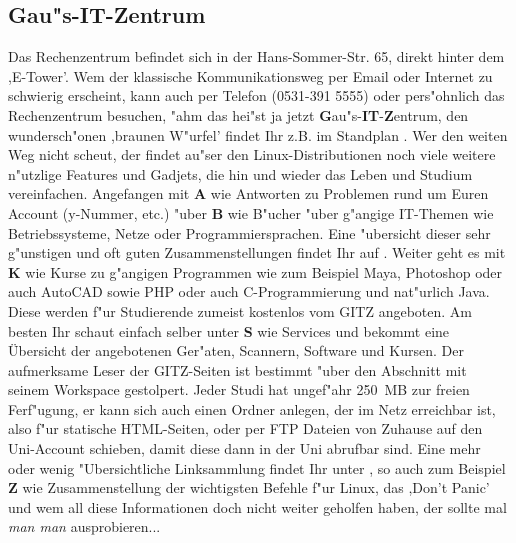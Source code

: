 \subsection{Gau"s-IT-Zentrum}

Das Rechenzentrum befindet sich in der Hans-Sommer-Str. 65, direkt hinter dem ,E-Tower'.
Wem der klassische Kommunikationsweg per Email  oder Internet \mbox{} zu schwierig erscheint, kann auch per Telefon (0531-391 5555) oder pers"ohnlich das Rechenzentrum besuchen, "ahm das hei"st ja jetzt \textbf{G}au"s-\textbf{IT}-\textbf{Z}entrum, den wundersch"onen ,braunen W"urfel' findet Ihr z.B. im Standplan . Wer den weiten Weg nicht scheut, der findet au"ser den Linux-Distributionen noch viele weitere n"utzlige Features und Gadjets, die hin und wieder das Leben und Studium vereinfachen. Angefangen mit \textbf{A} wie Antworten zu Problemen rund um Euren Account (y-Nummer, etc.)
"uber \textbf{B} wie B"ucher "uber g"angige IT-Themen wie Betriebssysteme, Netze oder Programmiersprachen. Eine "ubersicht dieser sehr g"unstigen und oft guten Zusammenstellungen findet Ihr auf . Weiter geht es mit \textbf{K} wie Kurse  zu g"angigen Programmen wie zum Beispiel Maya, Photoshop oder auch AutoCAD sowie PHP oder auch C-Programmierung und nat"urlich Java. Diese werden f"ur Studierende zumeist kostenlos vom GITZ angeboten. Am besten Ihr schaut einfach selber unter \textbf{S} wie Services  und bekommt eine Übersicht der angebotenen Ger"aten, Scannern, Software und Kursen.\newline
Der aufmerksame Leser der GITZ-Seiten ist bestimmt "uber den Abschnitt mit seinem Workspace gestolpert. Jeder Studi hat ungef"ahr 250~MB zur freien Ferf"ugung, er kann sich auch einen Ordner anlegen, der im Netz erreichbar ist, also f"ur statische HTML-Seiten, oder per FTP Dateien von Zuhause auf den Uni-Account schieben, damit diese dann in der Uni abrufbar sind.\newline
Eine mehr oder wenig "Ubersichtliche Linksammlung findet Ihr unter , so auch zum Beispiel \textbf{Z} wie Zusammenstellung der wichtigsten Befehle f"ur Linux, das ,Don't Panic' 
und wem all diese Informationen doch nicht weiter geholfen haben, der sollte mal \textit{man man} ausprobieren...